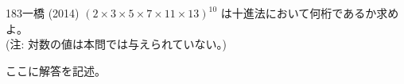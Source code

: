 \begin{thm}{183}{}{一橋 (2014)}
 $(2\times3\times5\times7\times11\times13)^{10}$ は十進法において何桁であるか求めよ。 \\
 (注: 対数の値は本問では与えられていない。)
\end{thm}

ここに解答を記述。